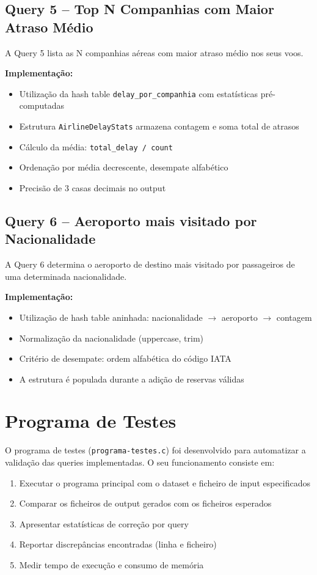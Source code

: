 \documentclass[a4paper,12pt]{scrreprt}
\begin{document}
\subsection{Query 5 -- Top N Companhias com Maior Atraso Médio}

A Query 5 lista as N companhias aéreas com maior atraso médio nos seus voos.

\textbf{Implementação:}
\begin{itemize}
    \item Utilização da hash table \texttt{delay\_por\_companhia} com estatísticas pré-computadas
    \item Estrutura \texttt{AirlineDelayStats} armazena contagem e soma total de atrasos
    \item Cálculo da média: \texttt{total\_delay / count}
    \item Ordenação por média decrescente, desempate alfabético
    \item Precisão de 3 casas decimais no output
\end{itemize}

\subsection{Query 6 -- Aeroporto mais visitado por Nacionalidade}

A Query 6 determina o aeroporto de destino mais visitado por passageiros de uma determinada nacionalidade.

\textbf{Implementação:}
\begin{itemize}
    \item Utilização de hash table aninhada: nacionalidade $\rightarrow$ aeroporto $\rightarrow$ contagem
    \item Normalização da nacionalidade (uppercase, trim)
    \item Critério de desempate: ordem alfabética do código IATA
    \item A estrutura é populada durante a adição de reservas válidas
\end{itemize}


\section{Programa de Testes}

O programa de testes (\texttt{programa-testes.c}) foi desenvolvido para automatizar a validação das queries implementadas. O seu funcionamento consiste em:

\begin{enumerate}
    \item Executar o programa principal com o dataset e ficheiro de input especificados
    \item Comparar os ficheiros de output gerados com os ficheiros esperados
    \item Apresentar estatísticas de correção por query
    \item Reportar discrepâncias encontradas (linha e ficheiro)
    \item Medir tempo de execução e consumo de memória
\end{enumerate}
\end{document}
